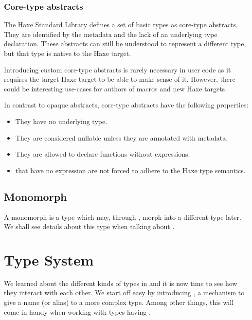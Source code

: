 \documentclass{haxe}
\begin{document}
\subsection{Core-type abstracts}
\label{types-abstract-core-type}

The Haxe Standard Library defines a set of basic types as core-type abstracts. They are identified by the  metadata and the lack of an underlying type declaration. These abstracts can still be understood to represent a different type, but that type is native to the Haxe target. 

Introducing custom core-type abstracts is rarely necessary in user code as it requires the target Haxe target to be able to make sense of it. However, there could be interesting use-cases for authors of macros and new Haxe targets.

In contrast to opaque abstracts, core-type abstracts have the following properties:

\begin{itemize}
	\item They have no underlying type.
	\item They are considered nullable unless they are annotated with  metadata.
	\item They are allowed to declare  functions without expressions.
	\item {} that have no expression are not forced to adhere to the Haxe type semantics.
\end{itemize}



\section{Monomorph}
\label{types-monomorph}

A monomorph is a type which may, through , morph into a different type later. We shall see details about this type when talking about .




\chapter{Type System}
\label{type-system}

We learned about the different kinds of types in  and it is now time to see how they interact with each other. We start off easy by introducing , a mechanism to give a name (or alias) to a more complex type. Among other things, this will come in handy when working with types having .
\end{document}
